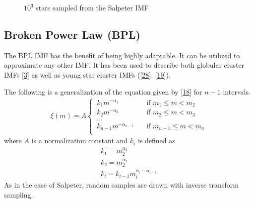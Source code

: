 \documentclass[letterpaper,10pt,english]{sphinxmanual}
\begin{document}
\begin{figure}[htbp]
\centering
\capstart

\noindent{}
\caption{\(10^3\) stars sampled from the Salpeter IMF}\label{\detokenize{NBodySimulation/Initialization:id41}}\label{\detokenize{NBodySimulation/Initialization:fig-initial-conditions-mass-salpeter}}\end{figure}


\subsection{Broken Power Law (BPL)}
\label{\detokenize{NBodySimulation/Initialization:broken-power-law-bpl}}
\sphinxAtStartPar
The BPL IMF has the benefit of being highly adaptable. It can be utilized to approximate any other IMF.
It has been used to describe both globular cluster IMFs {[}\hyperlink{cite.NBodySimulation/Appendix:id11}{3}{]} as well as young star cluster IMFs ({[}\hyperlink{cite.NBodySimulation/Appendix:id12}{28}{]}, {[}\hyperlink{cite.NBodySimulation/Appendix:id13}{19}{]}).

\sphinxAtStartPar
The following is a generalization of the equation given by {[}\hyperlink{cite.NBodySimulation/Appendix:id10}{18}{]} for \(n-1\) intervals.
\begin{equation*}
\begin{split}\xi(m)=A
\begin{cases}
    \ k_{1}m^{-\alpha_{1}} &\quad\text{if }m_{1}\leqslant m< m_{2}\\
    \ k_{2}m^{-\alpha_{2}} &\quad\text{if }m_{2}\leqslant m< m_{3}\\
    \ ...  \\
    \ k_{n-1}m^{-\alpha_{n-1}} &\quad\text{if }m_{n-1}\leqslant m< m_{n}\\
\end{cases}\end{split}
\end{equation*}
\sphinxAtStartPar
where \(A\) is a normalization constant and \(k_{i}\) is defined as
\begin{equation*}
\begin{split}k_{1} = m_{2}^{\alpha_{1}} \\
k_{2} = m_{2}^{\alpha_{2}} \\
k_{i} = k_{i-1}m_{i}^{\alpha_{i}-\alpha_{i-1}}\end{split}
\end{equation*}
\sphinxAtStartPar
As in the case of Salpeter, random samples are drawn with inverse transform sampling.
\end{document}
